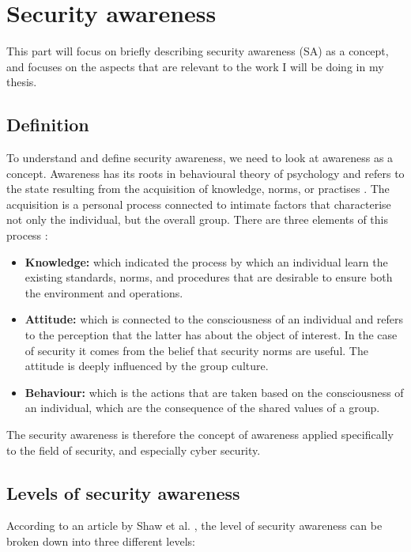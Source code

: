 \section{Security awareness}
This part will focus on briefly describing security awareness (SA) as a concept, and focuses on the aspects that are relevant to the work I will be doing in my thesis. 

\subsection{Definition}
To understand and define security awareness, we need to look at awareness as a concept. Awareness has its roots in behavioural theory of psychology and refers to the state resulting from the acquisition of knowledge, norms, or practises \cite{SecAware2019}. The acquisition is a personal process connected to intimate factors that characterise not only the individual, but the overall group. There are three elements of this process \cite{SecAware2019}:
\begin{itemize}
    \item \textbf{Knowledge:} which indicated the process by which an individual learn the existing standards, norms, and procedures that are desirable to ensure both the environment and operations.
    \item \textbf{Attitude:} which is connected to the consciousness of an individual and refers to the perception that the latter has about the object of interest. In the case of security it comes from the belief that security norms are useful. The attitude is deeply influenced by the group culture. 
    \item \textbf{Behaviour:} which is the actions that are taken based on the consciousness of an individual, which are the consequence of the shared values of a group. 
\end{itemize}
The security awareness is therefore the concept of awareness applied specifically to the field of security, and especially cyber security.

\subsection{Levels of security awareness}
According to an article by Shaw et al. \cite{SHAW200992}, the level of security awareness can be broken down into three different levels:


